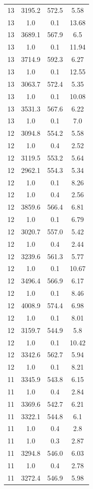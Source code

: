 \begin{table}[htbp]
\begin{tabular}{c c c c}
13 & 3195.2 & 572.5 & 5.58 \\
13 & 1.0 & 0.1 & 13.68 \\
13 & 3689.1 & 567.9 & 6.5 \\
13 & 1.0 & 0.1 & 11.94 \\
13 & 3714.9 & 592.3 & 6.27 \\
13 & 1.0 & 0.1 & 12.55 \\
13 & 3063.7 & 572.4 & 5.35 \\
13 & 1.0 & 0.1 & 10.08 \\
13 & 3531.3 & 567.6 & 6.22 \\
13 & 1.0 & 0.1 & 7.0 \\
12 & 3094.8 & 554.2 & 5.58 \\
12 & 1.0 & 0.4 & 2.52 \\
12 & 3119.5 & 553.2 & 5.64 \\
12 & 2962.1 & 554.3 & 5.34 \\
12 & 1.0 & 0.1 & 8.26 \\
12 & 1.0 & 0.4 & 2.56 \\
12 & 3859.6 & 566.4 & 6.81 \\
12 & 1.0 & 0.1 & 6.79 \\
12 & 3020.7 & 557.0 & 5.42 \\
12 & 1.0 & 0.4 & 2.44 \\
12 & 3239.6 & 561.3 & 5.77 \\
12 & 1.0 & 0.1 & 10.67 \\
12 & 3496.4 & 566.9 & 6.17 \\
12 & 1.0 & 0.1 & 8.46 \\
12 & 4008.9 & 574.4 & 6.98 \\
12 & 1.0 & 0.1 & 8.01 \\
12 & 3159.7 & 544.9 & 5.8 \\
12 & 1.0 & 0.1 & 10.42 \\
12 & 3342.6 & 562.7 & 5.94 \\
12 & 1.0 & 0.1 & 8.21 \\
11 & 3345.9 & 543.8 & 6.15 \\
11 & 1.0 & 0.4 & 2.84 \\
11 & 3369.6 & 542.7 & 6.21 \\
11 & 3322.1 & 544.8 & 6.1 \\
11 & 1.0 & 0.4 & 2.8 \\
11 & 1.0 & 0.3 & 2.87 \\
11 & 3294.8 & 546.0 & 6.03 \\
11 & 1.0 & 0.4 & 2.78 \\
11 & 3272.4 & 546.9 & 5.98 \\

\end{tabular}
\end{table}
